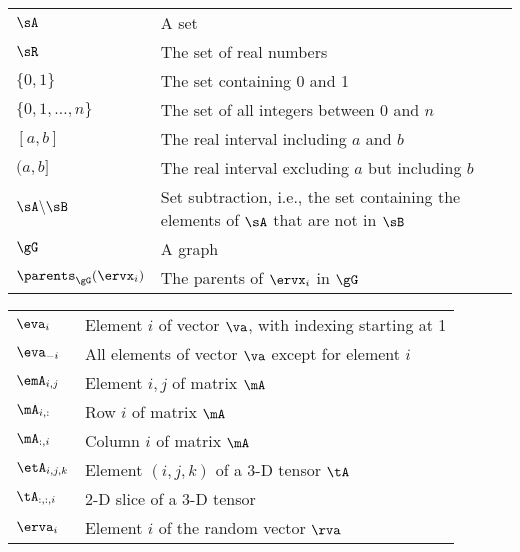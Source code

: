 \bgroup
\def\arraystretch{1.5}

\begin{tabular}{p{1.5in}p{3.5in}}
$\displaystyle \sA$ & A set \\
$\displaystyle \sR$ & The set of real numbers \\
$\displaystyle \{0, 1\}$ & The set containing 0 and 1 \\
$\displaystyle \{0, 1, \dots, n \}$ & The set of all integers between $0$ and $n$ \\
$\displaystyle [a, b]$ & The real interval including $a$ and $b$ \\
$\displaystyle (a, b]$ & The real interval excluding $a$ but including $b$ \\
$\displaystyle \sA \backslash \sB$ & Set subtraction, i.e., the set containing the elements of $\sA$ that are not in $\sB$ \\
$\displaystyle \gG$ & A graph \\
$\displaystyle \parents_\gG(\ervx_i)$ & The parents of $\ervx_i$ in $\gG$
\end{tabular}
\vspace{0.5cm}

\bgroup
\def\arraystretch{1.5}
\begin{tabular}{p{1.5in}p{3.5in}}
$\displaystyle \eva_i$ & Element $i$ of vector $\va$, with indexing starting at 1 \\
$\displaystyle \eva_{-i}$ & All elements of vector $\va$ except for element $i$ \\
$\displaystyle \emA_{i,j}$ & Element $i, j$ of matrix $\mA$ \\
$\displaystyle \mA_{i, :}$ & Row $i$ of matrix $\mA$ \\
$\displaystyle \mA_{:, i}$ & Column $i$ of matrix $\mA$ \\
$\displaystyle \etA_{i, j, k}$ & Element $(i, j, k)$ of a 3-D tensor $\tA$ \\
$\displaystyle \tA_{:, :, i}$ & 2-D slice of a 3-D tensor\\
$\displaystyle \erva_i$ & Element $i$ of the random vector $\rva$ \\
\end{tabular}
\egroup
\vspace{0.5cm}

